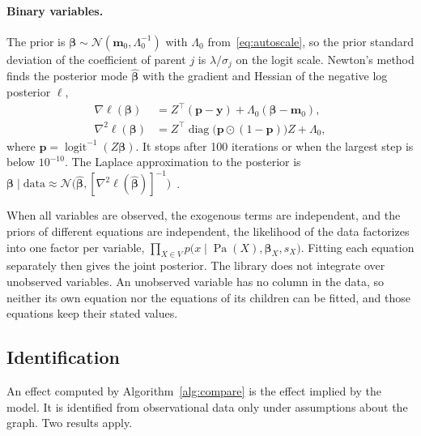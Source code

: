 \documentclass[12pt]{article}
\DeclareMathOperator{\logit}{logit}
\DeclareMathOperator{\Pa}{Pa}
\newcommand{\expit}{\logit^{-1}}
\theoremstyle{plain}
\theoremstyle{definition}
\begin{document}
\paragraph{Binary variables.}
The prior is $\boldsymbol\beta\sim\mathcal{N}(\mathbf{m}_0,\Lambda_0^{-1})$ with $\Lambda_0$ from~\eqref{eq:autoscale}, so the prior standard deviation of the coefficient of parent $j$ is $\lambda/\sigma_j$ on the logit scale. Newton's method finds the posterior mode $\hat{\boldsymbol\beta}$ with the gradient and Hessian of the negative log posterior $\ell$,
\begin{align}
    \nabla\ell(\boldsymbol\beta)&=Z^{\top}(\mathbf{p}-\mathbf{y})+\Lambda_0(\boldsymbol\beta-\mathbf{m}_0), \nonumber\\
    \nabla^2\ell(\boldsymbol\beta)&=Z^{\top}\operatorname{diag}\bigl(\mathbf{p}\odot(1-\mathbf{p})\bigr)Z+\Lambda_0, \label{eq:newton}
\end{align}
where $\mathbf{p}=\expit(Z\boldsymbol\beta)$. It stops after 100 iterations or when the largest step is below $10^{-10}$. The Laplace approximation to the posterior is $\boldsymbol\beta\mid\text{data}\approx\mathcal{N}\bigl(\hat{\boldsymbol\beta},[\nabla^2\ell(\hat{\boldsymbol\beta})]^{-1}\bigr)$~\cite{gelman2013bda}.

When all variables are observed, the exogenous terms are independent, and the priors of different equations are independent, the likelihood of the data factorizes into one factor per variable, $\prod_{X\in V}p\bigl(x\mid\Pa(X),\boldsymbol\beta_X,s_X\bigr)$. Fitting each equation separately then gives the joint posterior. The library does not integrate over unobserved variables. An unobserved variable has no column in the data, so neither its own equation nor the equations of its children can be fitted, and those equations keep their stated values.

\subsection{Identification}\label{sec:identification}

An effect computed by Algorithm~\ref{alg:compare} is the effect implied by the model. It is identified from observational data only under assumptions about the graph. Two results apply.
\end{document}
